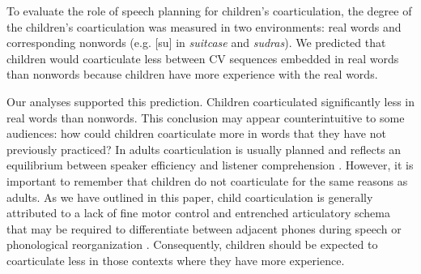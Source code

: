 \documentclass[a4paper,man,natbib,donotrepeattitle, apacite]{apa6}
\begin{document}
To evaluate the role of speech planning for children’s coarticulation, the degree of the children’s coarticulation was measured in two environments: real words and corresponding nonwords (e.g. [su] in \textit{suitcase} and \textit{sudras}). We predicted that children would coarticulate less between CV sequences embedded in real words than nonwords because children have more experience with the real words. 

Our analyses supported this prediction. Children coarticulated significantly less in real words than nonwords. This conclusion may appear counterintuitive to some audiences: how could children coarticulate more in words that they have not previously practiced? In adults coarticulation is usually planned \cite{whalenCoarticulationLargelyPlanned1990} and reflects an equilibrium between speaker efficiency and listener comprehension \cite{bradlowConfluentTalkerListeneroriented2002}. However, it is important to remember that children do not coarticulate for the same reasons as adults. As we have outlined in this paper, child coarticulation is generally attributed to a lack of fine motor control and entrenched articulatory schema that may be required to differentiate between adjacent phones during speech \cite{goffmanRelationsSegmentalMotor2007,greenPhysiologicDevelopmentSpeech2000,mcallisterbyunMotorInfluencesGrammar2016} or phonological reorganization \cite{nittrouerEmergencePhoneticSegments1989,nittrouerHowChildrenLearn1996,noiraySpokenLanguageDevelopment2019,redfordGrammaticalWordProduction2018,zharkovaCoarticulationIndicatorSpeech2011}. Consequently, children should be expected to coarticulate less in those contexts where they have more experience.
\end{document}
